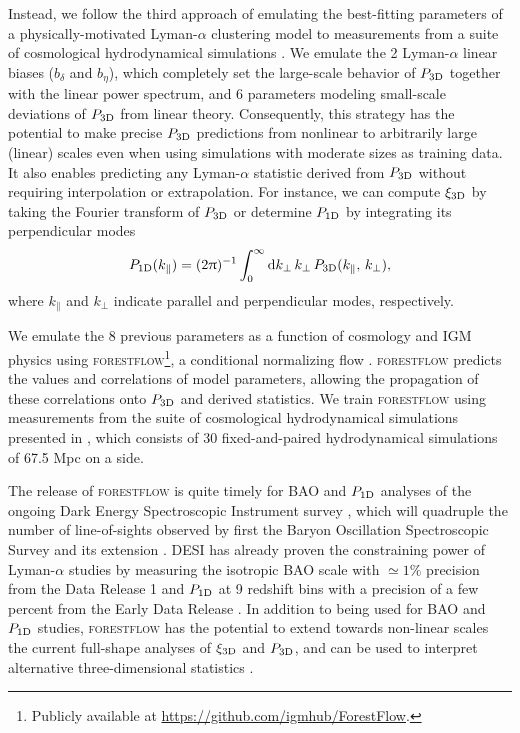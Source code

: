 \documentclass[longauth]{aa}
\newcommand{\lya}{Lyman-$\alpha$\xspace}
\newcommand{\poned}{\ensuremath{P_{\rm 1D}}\xspace}
\newcommand{\xithreed}{\ensuremath{\xi_{\rm 3D}}\xspace}
\newcommand{\pthreed}{\ensuremath{P_{\rm 3D}}\xspace}
\newcommand{\forestflow}{\textsc{forestflow}\xspace}
\begin{document}
Instead, we follow the third approach of emulating the best-fitting parameters of a physically-motivated \lya clustering model to measurements from a suite of cosmological hydrodynamical simulations \citep[see][]{mcdonald2003MeasurementCosmologicalGeometry, arinyo-i-prats2015NonlinearPowerSpectrum}. We emulate the 2 \lya linear biases ($b_\delta$ and $b_\eta$), which completely set the large-scale behavior of \pthreed together with the linear power spectrum, and 6 parameters modeling small-scale deviations of \pthreed from linear theory. Consequently, this strategy has the potential to make precise \pthreed predictions from nonlinear to arbitrarily large (linear) scales even when using simulations with moderate sizes as training data. It also enables predicting any \lya statistic derived from \pthreed without requiring interpolation or extrapolation. For instance, we can compute \xithreed by taking the Fourier transform of \pthreed or determine \poned by integrating its perpendicular modes
%
\begin{equation}
    \label{eq:p1d}
    \poned(k_\parallel)=(2\uppi)^{-1}\int_0^\infty \mathrm{d} k_\perp\, k_\perp\, \pthreed(k_\parallel,\, k_\perp),
\end{equation}
%
where $k_\parallel$ and $k_\perp$ indicate parallel and perpendicular modes, respectively.

We emulate the 8 previous parameters as a function of cosmology and IGM physics using \forestflow\footnote{Publicly available at \url{https://github.com/igmhub/ForestFlow}.}, a conditional normalizing flow \citep[cNFs;][]{Winkler2019, cNF_Papamakarios}. \forestflow predicts the values and correlations of model parameters, allowing the propagation of these correlations onto \pthreed and derived statistics. We train \forestflow using measurements from the suite of cosmological hydrodynamical simulations presented in \citet{Pedersen2021}, which consists of 30 fixed-and-paired hydrodynamical simulations of 67.5 Mpc on a side.

The release of \forestflow is quite timely for BAO and \poned analyses of the ongoing Dark Energy Spectroscopic Instrument survey \citep[DESI;][]{DESI_collab2016}, which will quadruple the number of line-of-sights observed by first the Baryon Oscillation Spectroscopic Survey \citep[BOSS;][]{boss_dawson2013} and its extension \citep[eBOSS;][]{eboss_dawson2016}. DESI has already proven the constraining power of \lya studies by measuring the isotropic BAO scale with $\simeq1\%$ precision from the Data Release 1 \citep{desicollaboration2024DESI2024IV} and \poned at 9 redshift bins with a precision of a few percent from the Early Data Release \citep{ravoux2023DarkEnergySpectroscopica, karacayli2024Optimal1DLy}. In addition to being used for BAO and \poned studies, \forestflow has the potential to extend towards non-linear scales the current full-shape analyses of \xithreed \citep{cuceu2023ConstraintsCosmicExpansion, 2023MNRAS.518.2567G} and \pthreed \citep{fontribera2018HowEstimate3D, Belsunce2024eBOSS, Horowitz2024}, and can be used to interpret alternative three-dimensional statistics \citep{hui1999GeometricalTestCosmological, fontribera2018HowEstimate3D, Karim2023}.
\end{document}
